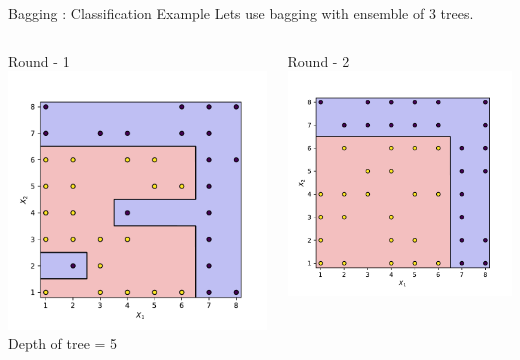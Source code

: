 \documentclass{beamer}
\begin{document}
	\begin{frame}{Bagging : Classification Example}
	Lets use bagging with ensemble of 3 trees.\\
	\vspace{1cm}
	\begin{columns}
		\begin{column}{0.3\textwidth}
			\centering
			Round - 1\\
			\vspace{0.5cm}
			\includegraphics[width = \textwidth]{decision-boundary-0}
			Depth of tree = 5
		\end{column}
		\begin{column}{0.3\textwidth}
			\centering
			Round - 2\\
			\vspace{0.5cm}
			\includegraphics[width = \textwidth]{decision-boundary-1}

\end{column}
\end{columns}
\end{frame}
\end{document}
